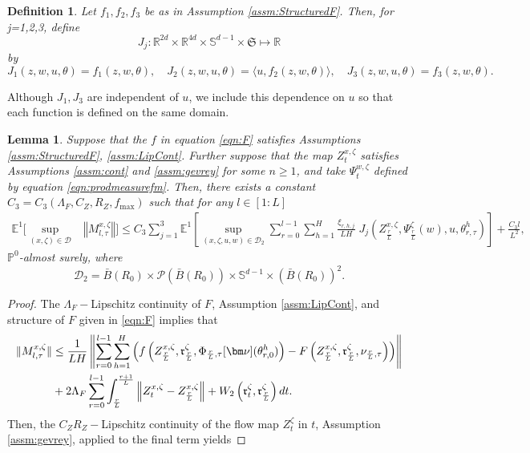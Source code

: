 \documentclass{article}
\newtheorem{lemma}[theorem]{Lemma}
\newtheorem{definition}[theorem]{Definition}
\newcommand{\R}{\mathbb{R}}
\begin{document}
\begin{appendices}
\begin{definition}\label{def:J}
Let $f_1,f_2,f_3$ be as in Assumption \ref{assm:StructuredF}. Then, for j=1,2,3, define 
\[
    J_j: \R^{2d}\times \R^{4d}\times \mathbb S^{d-1}\times\mathfrak{S}\mapsto \R
\]
by 
\[
J_1(z,w,u,\theta) = f_1(z,w,\theta), \quad J_2(z,w,u,\theta)=\langle u,f_2(z,w,\theta)\rangle, \quad J_3(z,w,u,\theta)=f_3(z,w,\theta).
\]
\end{definition}
Although $J_1,J_3$ are independent of $u$, we include this dependence on $u$ so that each function is defined on the same domain.
\begin{lemma}\label{lemma:L1Mstar}
Suppose that the $f$ in equation \eqref{eqn:F} satisfies Assumptions \ref{assm:StructuredF}, \ref{assm:LipCont}. Further suppose that the map $Z^{x,\zeta}_t$ satisfies Assumptions \ref{assm:cont} and  \ref{assm:gevrey} for some $n\ge 1$, and take $\Psi^{w,\zeta}_t$ defined by equation \eqref{eqn:prodmeasurefm}. 
Then, there exists a constant $C_3=C_3(\Lambda_F,C_Z,R_Z,f_\mathrm{max})$ such that for any $l\in[1:L]$
\begin{align*}
        \mathbb E^1\Bigg[\sup_{(x,\zeta)\in\mathscr D}&\left\Vert M^{x,\zeta}_{l,\tau} \right\Vert \Bigg]\le C_3\sum_{j=1}^3\mathbb E^1 \left[\sup_{(x,\zeta,u,w) \in \mathscr D_2}\sum_{r=0}^{l-1}\sum_{h=1}^H  \frac{\xi_{r,h,j}}{LH}\;J_j(Z^{x,\zeta}_\frac{r}{L},\Psi^{\zeta}_\frac{r}{L}(w),u,\theta^h_{r,\tau})\right]+\frac{C_3 l}{L^2}, 
\end{align*}
$\mathbb P^0$-almost surely, where
\[
\mathscr D_2 =\bar B(R_0)\times \mathcal P(\bar B(R_0))\times \mathbb S^{d-1}\times (\bar B(R_0))^2.
\]
\end{lemma}
\begin{proof}
The $\Lambda_F-$Lipschitz continuity of $F$, Assumption \ref{assm:LipCont}, and structure of $F$ given in \eqref{eqn:F} implies that
\begin{align*}
    \Vert M^{x,\zeta}_{l,\tau}\Vert &\le \frac{1}{LH}\left\Vert \sum_{r=0}^{l-1} \sum_{h=1}^H \left(f\left(Z^{x,\zeta}_\frac{r}{L},\mathfrak{r}^\zeta_\frac{r}{L},\Phi_{\frac{r}{L},\tau}[\bm\nu](\theta_{r,0}^h)\right)-F\left(Z^{x,\zeta}_\frac{r}{L},\mathfrak{r}^\zeta_\frac{r}{L},\nu_{\frac{r}{L},\tau}\right)\right)\right\Vert\notag\\
    &+2\Lambda_F\sum_{r=0}^{l-1}\int_\frac{r}{L}^\frac{r+1}{L}\left\Vert Z^{x,\zeta}_t-Z^{x,\zeta}_\frac{r}{L} \right\Vert+ W_2\left(\mathfrak{r}^\zeta_t,\mathfrak{r}^\zeta_\frac{r}{L}\right)dt.
\end{align*}
Then, the $ C_Z R_Z-$Lipschitz continuity of the flow map $Z^\zeta_t$ in $t$,  Assumption \ref{assm:gevrey}, applied to the final term yields

\end{proof}
\end{appendices}
\end{document}
